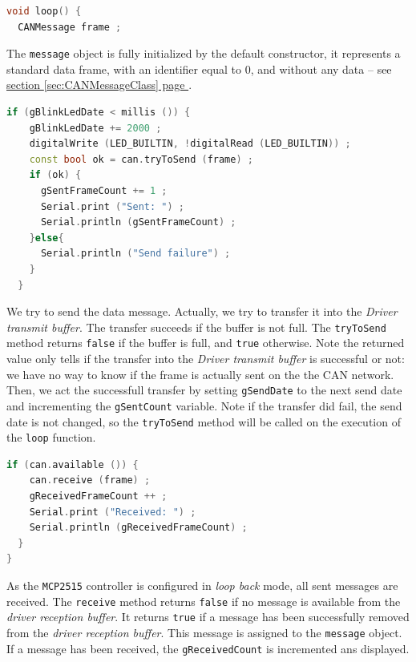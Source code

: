 \documentclass[10pt, a4paper, obeyspaces, openany]{extarticle}
\newcommand\refSectionPage[1]{\hyperref[sec:#1]{section \ref*{sec:#1} page \pageref{sec:#1}}}
\begin{document}
{ \small\begin{lstlisting}[language=c++]
void loop() {
  CANMessage frame ;
\end{lstlisting}}
The \texttt{message} object is fully initialized by the default constructor, it represents a standard data frame, with an identifier equal to $0$, and without any data -- see \refSectionPage{CANMessageClass}. 







{ \small\begin{lstlisting}[language=c++]
  if (gBlinkLedDate < millis ()) {
    gBlinkLedDate += 2000 ;
    digitalWrite (LED_BUILTIN, !digitalRead (LED_BUILTIN)) ;
    const bool ok = can.tryToSend (frame) ;
    if (ok) {
      gSentFrameCount += 1 ;
      Serial.print ("Sent: ") ;
      Serial.println (gSentFrameCount) ;
    }else{
      Serial.println ("Send failure") ;
    }
  }
\end{lstlisting}}
We try to send the data message. Actually, we try to transfer it into the \emph{Driver transmit buffer}. The transfer succeeds if the buffer is not full. The \texttt{tryToSend} method returns \texttt{false} if the buffer is full, and \texttt{true} otherwise. Note the returned value only tells if the transfer into the \emph{Driver transmit buffer} is successful or not: we have no way to know if the frame is actually sent on the the CAN network. Then, we act the successfull transfer by setting \texttt{gSendDate} to the next send date and incrementing the \texttt{gSentCount} variable. Note if the transfer did fail, the send date is not changed, so the \texttt{tryToSend} method will be called on the execution of the \texttt{loop} function.


{ \small\begin{lstlisting}[language=c++]
  if (can.available ()) {
    can.receive (frame) ;
    gReceivedFrameCount ++ ;
    Serial.print ("Received: ") ;
    Serial.println (gReceivedFrameCount) ;
  }
}
\end{lstlisting}}
As the \texttt{MCP2515} controller is configured in \emph{loop back} mode, all sent messages are received. The \texttt{receive} method returns \texttt{false} if no message is available from the \emph{driver reception buffer}. It returns \texttt{true} if a message has been successfully removed from the \emph{driver reception buffer}. This message is assigned to the \texttt{message} object. If a message has been received, the \texttt{gReceivedCount} is incremented ans displayed.
\end{document}
